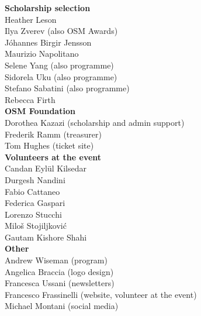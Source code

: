 \begin{multicols}{2}
\begin{small}
    \vspace{\volunteerSpace}
    \textbf{Scholarship selection}\\
    Heather Leson\\
    Ilya Zverev (also OSM Awards)\\
    Jóhannes Birgir Jensson\\
    Maurizio Napolitano\\
    Selene Yang (also programme)\\
    Sidorela Uku (also programme)\\
    Stefano Sabatini (also programme)\\
    Rebecca Firth\\

    \vspace{\volunteerSpace}
    \textbf{OSM Foundation}\\
    Dorothea Kazazi (scholarship and admin support)\\
    Frederik Ramm (treasurer)\\
    Tom Hughes (ticket site)\\

    \vspace{\volunteerSpace}
    \textbf{Volunteers at the event}\\
    Candan Eylül Kilsedar\\
    Durgesh Nandini\\
    Fabio Cattaneo\\
    Federica Gaspari\\
    Lorenzo Stucchi\\
    Miloš Stojiljković\\
    Gautam Kishore Shahi\\

    \vspace{\volunteerSpace}
    \textbf{Other}\\
    Andrew Wiseman (program)\\
    Angelica Braccia (logo design)\\
    Francesca Ussani (newsletters)\\
    Francesco Frassinelli (website, volunteer at the event)\\
    Michael Montani (social media)\\
  \end{small}
\end{multicols}
\justifying
